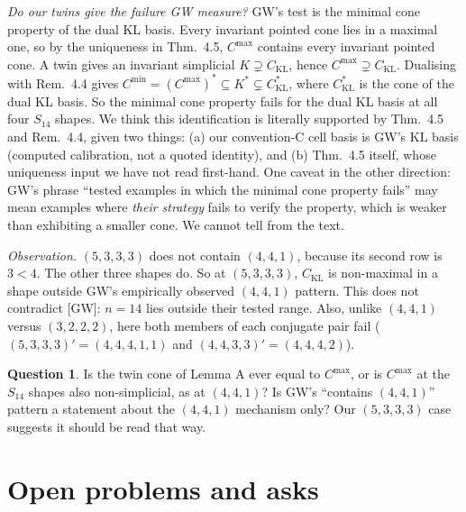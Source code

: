 \documentclass[11pt]{amsart}
\newcommand{\gr}[1]{\textsf{#1}}
\theoremstyle{definition}
\newtheorem{question}[theorem]{Question}
\theoremstyle{remark}
\newcommand{\CKL}{C_{\mathrm{KL}}}
\begin{document}
\emph{Do our twins give the failure GW measure?} GW's test is the minimal cone property of the dual KL basis. Every invariant pointed cone lies in a maximal one, so by the uniqueness in Thm.~4.5, $C^{\max}$ contains every invariant pointed cone. A twin gives an invariant simplicial $K\supsetneq\CKL$, hence $C^{\max}\supsetneq\CKL$. Dualising with Rem.~4.4 gives $C^{\min}=(C^{\max})^*\subseteq K^*\subsetneq\CKL^*$, where $\CKL^*$ is the cone of the dual KL basis. So the minimal cone property fails for the dual KL basis at all four $S_{14}$ shapes. We think this identification is literally supported by Thm.~4.5 and Rem.~4.4, given two things: (a) our convention-C cell basis is GW's KL basis (\gr{computed} calibration, not a quoted identity), and (b) Thm.~4.5 itself, whose uniqueness input we have not read first-hand. One caveat in the other direction: GW's phrase ``tested examples in which the minimal cone property fails'' may mean examples where \emph{their strategy} fails to verify the property, which is weaker than exhibiting a smaller cone. We cannot tell from the text.

\emph{Observation.} $(5,3,3,3)$ does not contain $(4,4,1)$, because its second row is $3<4$. The other three shapes do. So at $(5,3,3,3)$, $\CKL$ is non-maximal in a shape outside GW's empirically observed $(4,4,1)$ pattern. This does not contradict [GW]: $n=14$ lies outside their tested range. Also, unlike $(4,4,1)$ versus $(3,2,2,2)$, here both members of each conjugate pair fail ($(5,3,3,3)'=(4,4,4,1,1)$ and $(4,4,3,3)'=(4,4,4,2)$).

\begin{question}
Is the twin cone of Lemma A ever equal to $C^{\max}$, or is $C^{\max}$ at the $S_{14}$ shapes also non-simplicial, as at $(4,4,1)$? Is GW's ``contains $(4,4,1)$'' pattern a statement about the $(4,4,1)$ mechanism only? Our $(5,3,3,3)$ case suggests it should be read that way.
\end{question}

\section{Open problems and asks}
\end{document}
